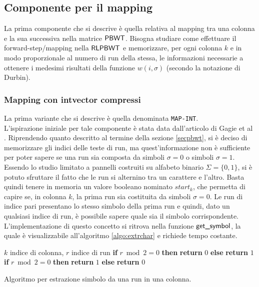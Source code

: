 \subsection{Componente per il mapping}
La prima componente che si descrive è quella relativa
al mapping tra una colonna e la sua successiva nella matrice $\mbox{\rm {\sf PBWT}}$. Bisogna 
studiare come effettuare il forward-step/mapping nella $\mbox{\rm {\sf RLPBWT}}$ e
memorizzare, per 
ogni colonna $k$ e in modo proporzionale al numero di run della stessa, le
informazioni necessarie a ottenere i medesimi risultati della funzione
$w(i,\sigma)$ (secondo la notazione di Durbin). 
\subsubsection{Mapping con intvector compressi}
La prima variante che si descrive è quella denominata \texttt{MAP-INT}.\\
L'ispirazione iniziale per tale componente è stata data dall'articolo di Gagie
et al \cite{tricks}. Riprendendo quanto descritto al termine della sezione
\ref{secpbwt}, si è deciso di
memorizzare gli indici delle teste di run, ma quest'informazione non è
sufficiente per poter sapere 
se una run sia composta da simboli $\sigma=0$ o simboli
$\sigma=1$. Essendo lo studio limitato a pannelli costruiti su alfabeto binario
$\Sigma=\{0,1\}$, si è 
potuto sfruttare il fatto che le run si alternino tra un carattere e
l'altro. Basta quindi tenere in memoria un valore booleano nominato
$start_k$, che permetta di 
capire se, in colonna $k$, la prima run sia costituita da simboli
$\sigma=0$. Le run di 
indice pari presentano lo stesso simbolo della prima run e quindi, dato un
qualsiasi indice di run, è possibile sapere quale sia il simbolo corrispondente.
L'implementazione di questo concetto si ritrova nella
funzione $\mbox{\rm {\sf get\_symbol}}$, la quale è
visualizzabile all'algoritmo \ref{algo:extrchar} e richiede tempo costante.
\begin{algorithm}
  \footnotesize
  \begin{algorithmic}[1]
    \Comment $k$ indice di colonna, $r$ indice di run
    \State \textbf{if} $r\bmod 2 = 0$ \textbf{then} \textbf{return} $0$
    \textbf{else} \textbf{return} $1$
    \Else
    \State \textbf{if} $r\bmod 2 = 0$ \textbf{then} \textbf{return} $1$
    \textbf{else} \textbf{return} $0$
    \EndIf
    \EndFunction
  \end{algorithmic}
  \caption{Algoritmo per estrazione simbolo da una run in una colonna.}
  \label{algo:extrchar}
\end{algorithm}

